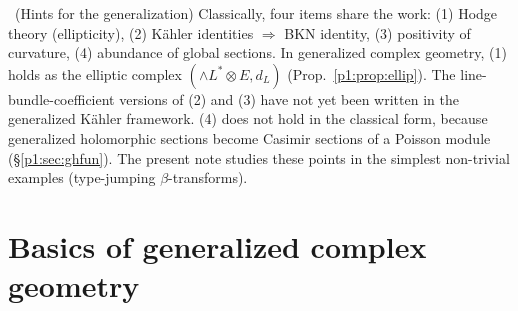 \begin{rem}\tK\ (Hints for the generalization)
Classically, four items share the work: (1) Hodge theory (ellipticity), (2) K\"ahler identities $\Rightarrow$ BKN identity, (3) positivity of curvature, (4) abundance of global sections. In generalized complex geometry, (1) holds as the elliptic complex $(\wedge L^*\otimes E,d_L)$ (Prop.~\ref{p1:prop:ellip}). The line-bundle-coefficient versions of (2) and (3) have not yet been written in the generalized K\"ahler framework. (4) does not hold in the classical form, because generalized holomorphic sections become Casimir sections of a Poisson module (\S\ref{p1:sec:ghfun}). The present note studies these points in the simplest non-trivial examples (type-jumping $\beta$-transforms).
\end{rem}

\section{Basics of generalized complex geometry}\label{p1:sec:gc}

